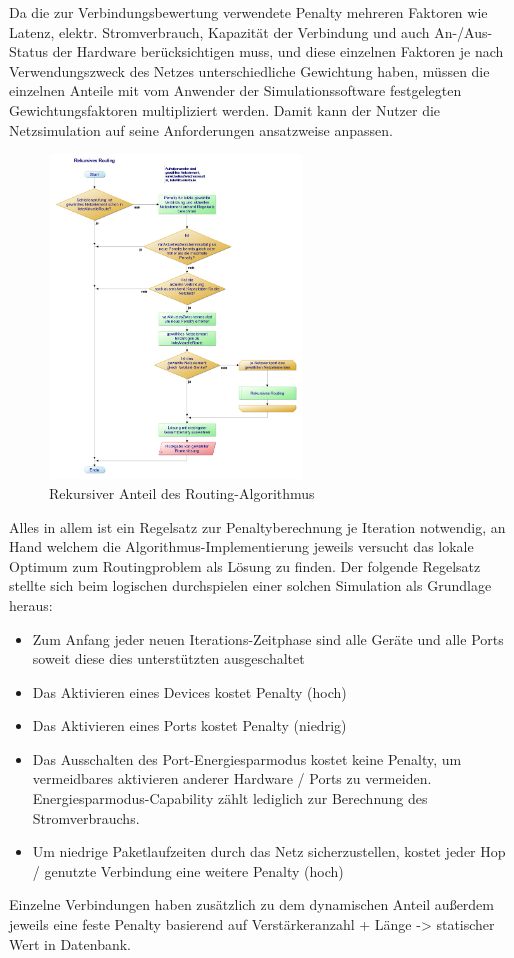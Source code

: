 \documentclass[12pt,titlepage]{article}
\begin{document}
Da die zur Verbindungsbewertung verwendete Penalty mehreren Faktoren wie Latenz, elektr. Stromverbrauch, Kapazität der Verbindung und auch An-/Aus-Status der Hardware berücksichtigen muss, und diese einzelnen Faktoren je nach Verwendungszweck des Netzes unterschiedliche Gewichtung haben, müssen die einzelnen Anteile mit vom Anwender der Simulationssoftware festgelegten Gewichtungsfaktoren multipliziert werden. Damit kann der Nutzer die Netzsimulation auf seine Anforderungen ansatzweise anpassen.
\begin{figure}[!ht]
	\centering
	\includegraphics[width=0.6\textwidth]{3Rekursives_Routing}
	\caption{Rekursiver Anteil des Routing-Algorithmus}
	\label{fig:3Rekursives_Routing}
\end{figure}


Alles in allem ist ein Regelsatz zur Penaltyberechnung je Iteration notwendig, an Hand welchem die Algorithmus-Implementierung jeweils versucht das lokale Optimum zum Routingproblem als Lösung zu finden.
Der folgende Regelsatz stellte sich beim logischen durchspielen einer solchen Simulation als Grundlage heraus:
\begin{itemize}
	\item Zum Anfang jeder neuen Iterations-Zeitphase sind alle Geräte und alle Ports soweit diese dies unterstützten ausgeschaltet
	\item Das Aktivieren eines Devices kostet Penalty (hoch)
	\item Das Aktivieren eines Ports kostet Penalty (niedrig)
	\item Das Ausschalten des Port-Energiesparmodus kostet keine Penalty, um vermeidbares aktivieren anderer Hardware / Ports zu vermeiden. Energiesparmodus-Capability zählt lediglich zur Berechnung des Stromverbrauchs.
	\item Um niedrige Paketlaufzeiten durch das Netz sicherzustellen, kostet jeder Hop / genutzte Verbindung eine weitere Penalty (hoch)
\end{itemize}
Einzelne Verbindungen haben zusätzlich zu dem dynamischen Anteil außerdem jeweils eine feste Penalty basierend auf Verstärkeranzahl + Länge -> statischer Wert in Datenbank.
\end{document}
